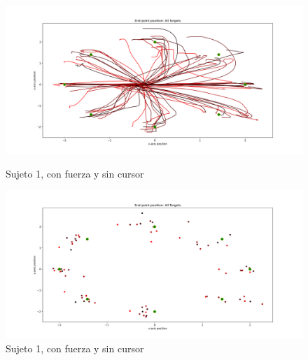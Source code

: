 \documentclass[a4paper,11pt, oneside]{book}
\begin{document}
\begin{figure}[H]
	\begin{minipage}[b]{0.5\linewidth}
		\centering
		\includegraphics[width=\linewidth]{sujeto1/force_no_cursor/trayectorias}
		\caption{Sujeto 1, con fuerza y sin cursor}
		\label{1-fase4-1}
	\end{minipage}
	\hspace{0.5cm}
	\begin{minipage}[b]{0.5\linewidth}
		\centering
		\includegraphics[width=\linewidth]{sujeto1/force_no_cursor/trayectorias_puntos}
		\caption{Sujeto 1, con fuerza y sin cursor}
		\label{1-fase4-2}
	\end{minipage}
\end{figure}
\end{document}
